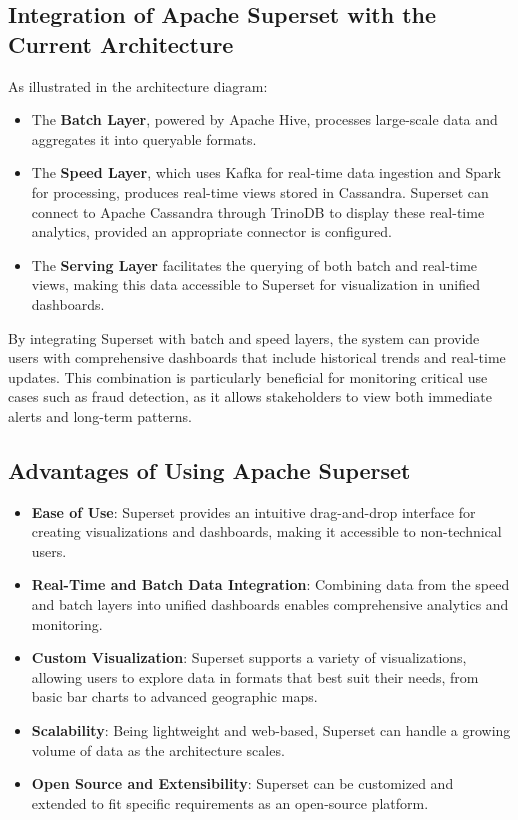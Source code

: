 \documentclass[12pt,a4paper, hidelinks]{article}
\begin{document}
\subsection{Integration of Apache Superset with the Current Architecture}
As illustrated in the architecture diagram:
\begin{itemize}
    \item The \textbf{Batch Layer}, powered by Apache Hive, processes large-scale data and aggregates it into queryable formats.
    \item The \textbf{Speed Layer}, which uses Kafka for real-time data ingestion and Spark for processing, produces real-time views stored in Cassandra. Superset can connect to Apache Cassandra through TrinoDB to display these real-time analytics, provided an appropriate connector is configured.
    \item The \textbf{Serving Layer} facilitates the querying of both batch and real-time views, making this data accessible to Superset for visualization in unified dashboards.
\end{itemize}

By integrating Superset with batch and speed layers, the system can provide users with comprehensive dashboards that include historical trends and real-time updates. This combination is particularly beneficial for monitoring critical use cases such as fraud detection, as it allows stakeholders to view both immediate alerts and long-term patterns.

\subsection{Advantages of Using Apache Superset}
\begin{itemize}
    \item \textbf{Ease of Use}: Superset provides an intuitive drag-and-drop interface for creating visualizations and dashboards, making it accessible to non-technical users.
    \item \textbf{Real-Time and Batch Data Integration}: Combining data from the speed and batch layers into unified dashboards enables comprehensive analytics and monitoring.
    \item \textbf{Custom Visualization}: Superset supports a variety of visualizations, allowing users to explore data in formats that best suit their needs, from basic bar charts to advanced geographic maps.
    \item \textbf{Scalability}: Being lightweight and web-based, Superset can handle a growing volume of data as the architecture scales.
    \item \textbf{Open Source and Extensibility}: Superset can be customized and extended to fit specific requirements as an open-source platform.
\end{itemize}
\end{document}
